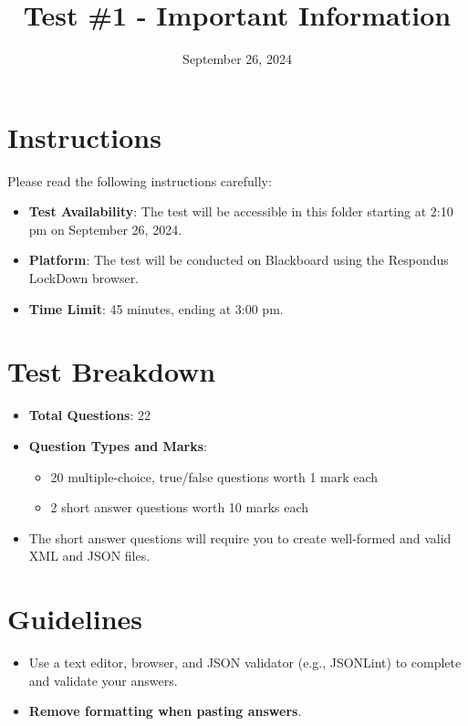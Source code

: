 \documentclass{article}
\begin{document}
\title{Test \#1 - Important Information}
\author{}
\date{September 26, 2024}
\maketitle

\section*{Instructions}
Please read the following instructions carefully:

\begin{itemize}
    \item \textbf{Test Availability}: The test will be accessible in this folder starting at 2:10 pm on September 26, 2024.
    \item \textbf{Platform}: The test will be conducted on Blackboard using the Respondus LockDown browser.
    \item \textbf{Time Limit}: 45 minutes, ending at 3:00 pm.
\end{itemize}

\section*{Test Breakdown}
\begin{itemize}
    \item \textbf{Total Questions}: 22
    \item \textbf{Question Types and Marks}:
    \begin{itemize}
        \item 20 multiple-choice, true/false questions worth 1 mark each
        \item 2 short answer questions worth 10 marks each
    \end{itemize}
    \item The short answer questions will require you to create well-formed and valid XML and JSON files.
\end{itemize}

\section*{Guidelines}
\begin{itemize}
    \item Use a text editor, browser, and JSON validator (e.g., JSONLint) to complete and validate your answers.
    \item \textbf{Remove formatting when pasting answers}.
\end{itemize}
\end{document}
